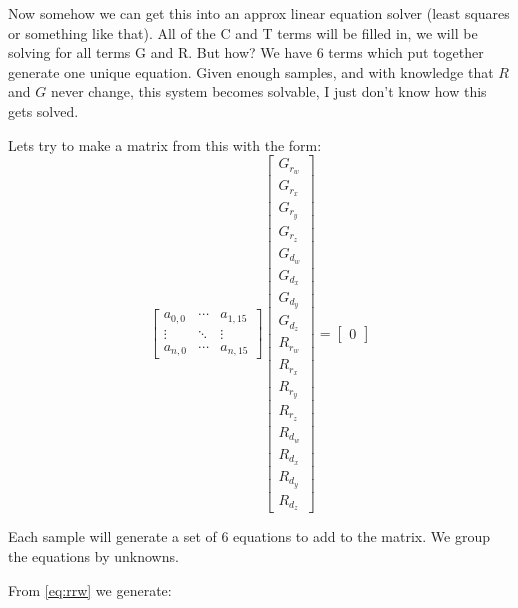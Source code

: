 \documentclass[12pt]{article}
\begin{document}
	Now somehow we can get this into an approx linear equation solver (least squares or something like that). All of the C and T terms will be filled in, we will be solving for all terms G and R. But how? We have 6 terms which put together generate one unique equation. Given enough samples, and with knowledge that $R$ and $G$ never change, this system becomes solvable, I just don't know how this gets solved. 
	
	Lets try to make a matrix from this with the form:
	\begin{equation}
		\begin{bmatrix}
			a_{0,0} & \cdots & a_{1,15} \\
			\vdots  & \ddots & \vdots   \\
			a_{n,0} & \cdots & a_{n,15} 
		\end{bmatrix}
		\begin{bmatrix}
			G_{r_w} \\
			G_{r_x} \\
			G_{r_y} \\
			G_{r_z} \\
			G_{d_w} \\
			G_{d_x} \\
			G_{d_y} \\
			G_{d_z} \\
			R_{r_w} \\
			R_{r_x} \\
			R_{r_y} \\
			R_{r_z} \\
			R_{d_w} \\
			R_{d_x} \\
			R_{d_y} \\
			R_{d_z}
		\end{bmatrix}
		=
		\begin{bmatrix}
			0
		\end{bmatrix}
		\label{eq:generalMatrix}
	\end{equation}
	
	Each sample will generate a set of 6 equations to add to the matrix. We group the equations by unknowns. 
	
	From \autoref{eq:rrw} we generate:
	
\end{document}
